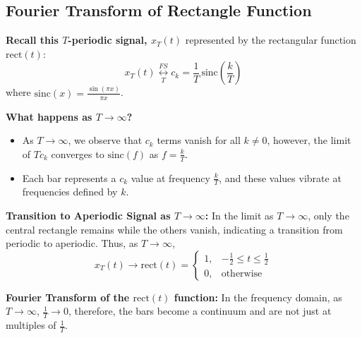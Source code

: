 \subsection{Fourier Transform of Rectangle Function}
\begin{intuition}
    \textbf{Recall this \( T \)-periodic signal, \( x_T(t) \)} represented by the rectangular function \( \text{rect}(t) \):
    \[
    x_T(t) \underset{T}{\overset{FS}{\leftrightarrow}} c_k = \frac{1}{T} \, \text{sinc} \left( \frac{k}{T} \right)
    \]
    where \( \text{sinc}(x) = \frac{\sin(\pi x)}{\pi x} \).
    \vspace{1em}

    \textbf{What happens as $T \to \infty$?}
    \begin{itemize}
        \item As \( T \to \infty \), we observe that \( c_k \) terms vanish for all \( k \neq 0 \), however, the limit of \( T c_k \) converges to \( \text{sinc}(f) \) as \( f = \frac{k}{T} \).
        \item Each bar represents a \( c_k \) value at frequency \( \frac{k}{T} \), and these values vibrate at frequencies defined by \( k \).
    \end{itemize}
    \vspace{1em}
    \textbf{Transition to Aperiodic Signal as \( T \to \infty \):} In the limit as \( T \to \infty \), only the central rectangle remains while the others vanish, indicating a transition from periodic to aperiodic. 
    Thus, as \( T \to \infty \),
    \[
    x_T(t) \to \text{rect}(t) = 
    \begin{cases}
    1, & -\frac{1}{2} \leq t \leq \frac{1}{2} \\
    0, & \text{otherwise}
    \end{cases}
    \]

    \textbf{Fourier Transform of the \( \text{rect}(t) \) function:} In the frequency domain, as \( T \to \infty \), \( \frac{1}{T} \to 0 \), therefore, the bars become a continuum and are not just at multiples of $\frac{1}{T}$. 
\end{intuition}

